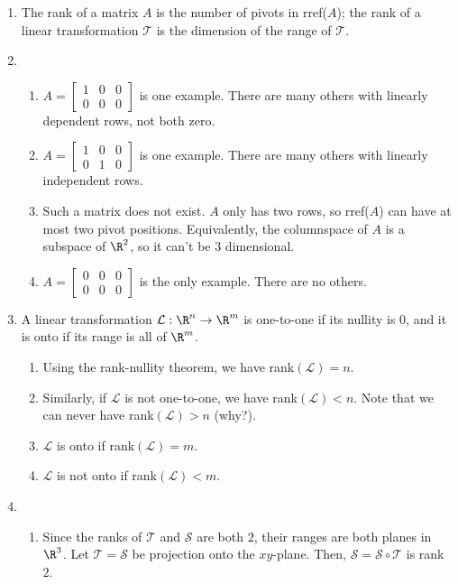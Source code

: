 		\begin{enumerate}
			\item
					The rank of a matrix $A$ is the number of pivots in rref($A$);
					the rank of a linear transformation $\mathcal T$ is the dimension of the range of $\mathcal T$.
			\item
			\begin{enumerate}
				\item $A=\begin{bmatrix}
					1 & 0 & 0 \\
					0 & 0 & 0
					\end{bmatrix}$ is one example. There are many others with linearly dependent rows, not both zero.
				\item $A=\begin{bmatrix}
					1 & 0 & 0 \\
					0 & 1 & 0
					\end{bmatrix}$ is one example. There are many others with linearly independent rows.
				\item Such a matrix does not exist. $A$ only has two rows, so rref($A$) can have at most two pivot positions. Equivalently, the columnspace of $A$ is a subspace of $\R^2$, so it can't be $3$ dimensional.
				\item $A=\begin{bmatrix}
					0 & 0 & 0 \\
					0 & 0 & 0
					\end{bmatrix}$ is the only example. There are no others.
			\end{enumerate}
			\item A linear transformation $\mathcal L:\R^n\to\R^m$
				is one-to-one if its nullity is $0$, and it is onto if its range is
				all of $\R^m$.
			\begin{enumerate}
				\item Using the rank-nullity theorem, we have rank$(\mathcal L) = n$.
				\item Similarly, if $\mathcal L$ is not one-to-one, we have rank$(\mathcal L) < n$. Note that we can never have rank$(\mathcal L)>n$ (why?).
				\item $\mathcal L$ is onto if rank$(\mathcal L)=m$.
				\item $\mathcal L$ is not onto if rank$(\mathcal L)<m$.
			\end{enumerate}
			\item
			\begin{enumerate}
				\item Since the ranks of $\mathcal T$ and $\mathcal S$ are both $2$,
					their ranges are both planes in $\R^{3}$. Let $\mathcal T=\mathcal
					S$ be projection onto the $xy$-plane. Then,
					$\mathcal S=\mathcal S\circ \mathcal T$ is rank $2$.


\end{enumerate}
\end{enumerate}
